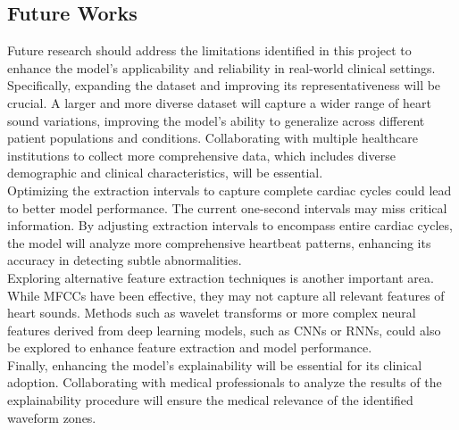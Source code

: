 \subsection{Future Works}
Future research should address the limitations identified in this project to enhance the model's applicability and reliability in real-world clinical settings.
Specifically, expanding the dataset and improving its representativeness will be crucial. A larger and more diverse dataset will capture a wider
range of heart sound variations, improving the model's ability to generalize across different patient populations and conditions.
Collaborating with multiple healthcare institutions to collect more comprehensive data, which includes diverse demographic and clinical characteristics, will be essential.\\
Optimizing the extraction intervals to capture complete cardiac cycles could lead to better model performance.
The current one-second intervals may miss critical information. By adjusting extraction intervals to encompass entire cardiac cycles,
the model will analyze more comprehensive heartbeat patterns, enhancing its accuracy in detecting subtle abnormalities.\\
Exploring alternative feature extraction techniques is another important area.
While MFCCs have been effective, they may not capture all relevant features of heart sounds.
Methods such as wavelet transforms or more complex neural features derived from deep learning models, such as CNNs or RNNs,
could also be explored to enhance feature extraction and model performance.\\
Finally, enhancing the model's explainability will be essential for its clinical adoption.
Collaborating with medical professionals to analyze the results of the explainability procedure will ensure the medical relevance of the identified waveform zones.